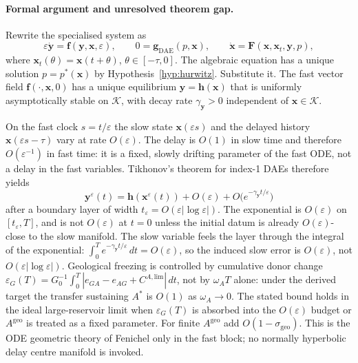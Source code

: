 \documentclass[11pt]{article}
\theoremstyle{definition}
\begin{document}
\paragraph{Formal argument and unresolved theorem gap.}
Rewrite the specialised system as
\[
\varepsilon\dot{\mathbf y}=\mathbf f(\mathbf y,\mathbf x,\varepsilon),\qquad
0=\mathbf g_{\mathrm{DAE}}(p,\mathbf x),\qquad
\dot{\mathbf x}=\mathbf F(\mathbf x,\mathbf x_t,\mathbf y,p),
\]
where $\mathbf x_t(\theta)=\mathbf x(t+\theta)$, $\theta\in[-\tau,0]$. The algebraic equation has a unique solution $p=p^*(\mathbf x)$ by Hypothesis~\ref{hyp:hurwitz}. Substitute it. The fast vector field $\mathbf f(\cdot,\mathbf x,0)$ has a unique equilibrium $\mathbf y=\mathbf h(\mathbf x)$ that is uniformly asymptotically stable on $\mathcal K$, with decay rate $\gamma_{\mathbf y}>0$ independent of $\mathbf x\in\mathcal K$.

On the fast clock $s=t/\varepsilon$ the slow state $\mathbf x(\varepsilon s)$ and the delayed history $\mathbf x(\varepsilon s-\tau)$ vary at rate $O(\varepsilon)$. The delay is $O(1)$ in slow time and therefore $O(\varepsilon^{-1})$ in fast time: it is a fixed, slowly drifting parameter of the fast ODE, not a delay in the fast variables. Tikhonov's theorem for index-1 DAEs \cite{tikhonov1952,hairer1996} therefore yields
\[
\mathbf y^\varepsilon(t)=\mathbf h(\mathbf x^\varepsilon(t))+O(\varepsilon)+O\bigl(e^{-\gamma_{\mathbf y}t/\varepsilon}\bigr)
\]
after a boundary layer of width $t_\varepsilon=O(\varepsilon|\log\varepsilon|)$. The exponential is $O(\varepsilon)$ on $[t_\varepsilon,T]$, and is not $O(\varepsilon)$ at $t=0$ unless the initial datum is already $O(\varepsilon)$-close to the slow manifold. The slow variable feels the layer through the integral of the exponential: $\int_0^T e^{-\gamma_{\mathbf y}t/\varepsilon}\,dt=O(\varepsilon)$, so the induced slow error is $O(\varepsilon)$, not $O(\varepsilon|\log\varepsilon|)$. Geological freezing is controlled by cumulative donor change $\varepsilon_G(T)=G_0^{-1}\int_0^T|e_{GA}-e_{AG}+C^{A,\mathrm{lim}}|\,dt$, not by $\omega_A T$ alone: under the derived target the transfer sustaining $A^*$ is $O(1)$ as $\omega_A\to 0$. The stated bound holds in the ideal large-reservoir limit when $\varepsilon_G(T)$ is absorbed into the $O(\varepsilon)$ budget or $A^{\mathrm{geo}}$ is treated as a fixed parameter. For finite $A^{\mathrm{geo}}$ add $O(1-\sigma_{\mathrm{geo}})$. This is the ODE geometric theory of Fenichel \cite{fenichel1979} only in the fast block; no normally hyperbolic delay centre manifold is invoked.
\end{document}
